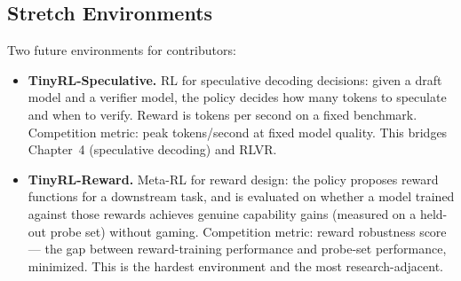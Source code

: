 \subsection{Stretch Environments}

Two future environments for contributors:

\begin{itemize}
  \item \textbf{TinyRL-Speculative.} RL for speculative decoding decisions: given a draft model and a verifier model, the policy decides how many tokens to speculate and when to verify. Reward is tokens per second on a fixed benchmark. Competition metric: peak tokens/second at fixed model quality. This bridges Chapter~4 (speculative decoding) and RLVR.

  \item \textbf{TinyRL-Reward.} Meta-RL for reward design: the policy proposes reward functions for a downstream task, and is evaluated on whether a model trained against those rewards achieves genuine capability gains (measured on a held-out probe set) without gaming. Competition metric: reward robustness score --- the gap between reward-training performance and probe-set performance, minimized. This is the hardest environment and the most research-adjacent.
\end{itemize}

